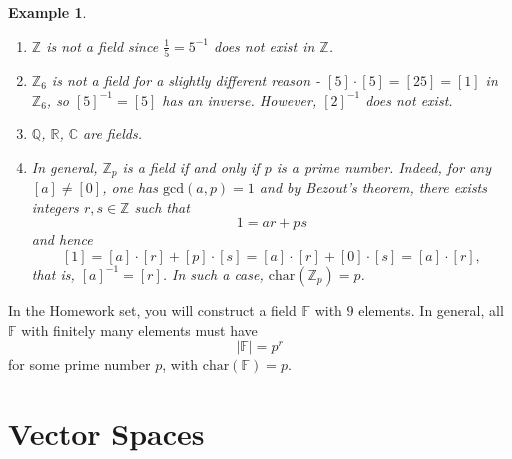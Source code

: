 \documentclass[12pt]{amsbook}
\newtheorem{example}[theorem]{Example}
\begin{document}
\begin{example}
    \begin{enumerate}
        \item $\mathbb{Z}$ is not a field since $\frac{1}{5} = 5^{-1}$ does not exist in $\mathbb{Z}$. 
        \item $\mathbb{Z}_6$ is not a field for a slightly different reason - $[5] \cdot [5] = [25] = [1]$ in $\mathbb{Z}_6$, so $[5]^{-1} = [5]$ has an inverse. However, $[2]^{-1}$ does not exist.
        \item  $\mathbb{Q}$, $\mathbb{R}$, $\mathbb{C}$ are fields.
        \item In general, $\mathbb{Z}_p$ is a field if and only if $p$ is a prime number. Indeed, for any $[a] \neq [0]$, one has $\mathrm{gcd}(a,p) = 1$ and by Bezout's theorem, there exists integers $r, s \in \mathbb{Z}$ such that
        $$1 = ar + ps$$
        and hence 
        $$[1] = [a]\cdot [r] + [p]\cdot [s] = [a]\cdot [r] + [0]\cdot [s] = [a]\cdot [r],$$
        that is, $[a]^{-1} = [r]$.
        In such a case, $\mathrm{char}(\mathbb{Z}_p) = p$. 
    \end{enumerate}
\end{example}
In the Homework set, you will construct a field $\mathbb{F}$ with $9$ elements. In general, all $\mathbb{F}$ with finitely many elements must have
$$|\mathbb{F}| = p^r$$
for some prime number $p$, with $\mathrm{char}(\mathbb{F}) = p$.


\chapter{Vector Spaces}
\end{document}
